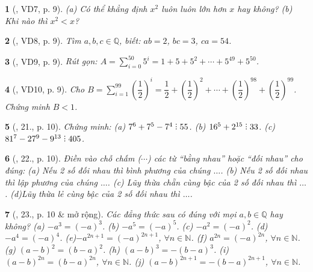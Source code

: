 \documentclass{article}
\newtheorem{baitoan}{}
\DeclareRobustCommand{\divby}{%
	\mathrel{\vbox{\baselineskip.65ex\lineskiplimit0pt\hbox{.}\hbox{.}\hbox{.}}}%
}
\begin{document}
\begin{baitoan}[\cite{Binh_Toan_7_tap_1}, VD7, p. 9]
	(a) Có thể khẳng định $x^2$ luôn luôn lớn hơn $x$ hay không? (b) Khi nào thì $x^2 < x$?
\end{baitoan}

\begin{baitoan}[\cite{Binh_Toan_7_tap_1}, VD8, p. 9]
	Tìm $a,b,c\in\mathbb{Q}$, biết: $ab = 2$, $bc = 3$, $ca = 54$.
\end{baitoan}

\begin{baitoan}[\cite{Binh_Toan_7_tap_1}, VD9, p. 9]
	Rút gọn: $A = \sum_{i=0}^{50} 5^i = 1 + 5 + 5^2 + \cdots + 5^{49} + 5^{50}$.
\end{baitoan}

\begin{baitoan}[\cite{Binh_Toan_7_tap_1}, VD10, p. 9]
	Cho $B = \sum_{i=1}^{99} \left(\dfrac{1}{2}\right)^i = \dfrac{1}{2} + \left(\dfrac{1}{2}\right)^2 + \cdots + \left(\dfrac{1}{2}\right)^{98} + \left(\dfrac{1}{2}\right)^{99}$. Chứng minh $B < 1$.
\end{baitoan}

\begin{baitoan}[\cite{Binh_Toan_7_tap_1}, 21., p. 10]
	Chứng minh: (a) $7^6 + 7^5 - 7^4\divby 55$. (b) $16^5 + 2^{15}\divby 33$. (c) $81^7 - 27^9 - 9^{13}\divby 405$.
\end{baitoan}

\begin{baitoan}[\cite{Binh_Toan_7_tap_1}, 22., p. 10]
	Điền vào chỗ chấm ($\cdots$) các từ ``bằng nhau'' hoặc ``đối nhau'' cho đúng: (a) Nếu 2 số đối nhau thì bình phương của chúng $\ldots$. (b) Nếu 2 số đối nhau thì lập phương của chúng $\ldots$. (c) Lũy thừa chẵn cùng bậc của 2 số đối nhau thì $\ldots$. (d)Lũy thừa lẻ cùng bậc của 2 số đối nhau thì $\ldots$.
\end{baitoan}

\begin{baitoan}[\cite{Binh_Toan_7_tap_1}, 23., p. 10 \& mở rộng]
	Các đẳng thức sau có đúng với mọi $a,b\in\mathbb{Q}$ hay không? (a) $-a^3 = (-a)^3$. (b) $-a^5 = (-a)^5$. (c) $-a^2 = (-a)^2$. (d)$-a^4 = (-a)^4$. (e)$-a^{2n+1} = (-a)^{2n+1}$, $\forall n\in\mathbb{N}$. (f) $a^{2n} = (-a)^{2n}$, $\forall n\in\mathbb{N}$. (g) $(a - b)^2 = (b - a)^2$. (h) $(a - b)^3 = -(b - a)^3$. (i) $(a - b)^{2n} = (b - a)^{2n}$, $\forall n\in\mathbb{N}$. (j) $(a - b)^{2n+1} = -(b - a)^{2n+1}$, $\forall n\in\mathbb{N}$.
\end{baitoan}
\end{document}
